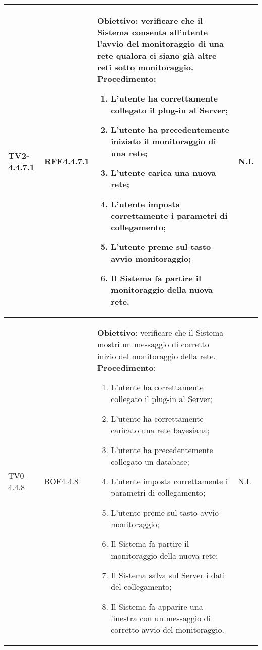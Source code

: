 \begin{longtable}{|C{.15\textwidth}|C{.13\textwidth}|m{.52\textwidth}|C{.08\textwidth}|}
TV2-4.4.7.1 & RFF4.4.7.1 &
	\textbf{Obiettivo}: verificare che il Sistema consenta all'utente l'avvio del monitoraggio di una rete qualora ci siano già altre reti sotto monitoraggio. \newline
	\textbf{Procedimento}:
	\begin{enumerate}
		\item L'utente ha correttamente collegato il plug-in al Server;
		\item L'utente ha precedentemente iniziato il monitoraggio di una rete;
		\item L'utente carica una nuova rete;
		\item L'utente imposta correttamente i parametri di collegamento;
		\item L'utente preme sul tasto avvio monitoraggio;
		\item Il Sistema fa partire il monitoraggio della nuova rete.
	\end{enumerate}
	& N.I. \\
\hline

TV0-4.4.8 & ROF4.4.8 &
	\textbf{Obiettivo}: verificare che il Sistema mostri un messaggio di corretto inizio del monitoraggio della rete. \newline
	\textbf{Procedimento}:
	\begin{enumerate}
		\item L'utente ha correttamente collegato il plug-in al Server;
		\item L'utente ha correttamente caricato una rete bayesiana;
		\item L'utente ha precedentemente collegato un database;
		\item L'utente imposta correttamente i parametri di collegamento;
		\item L'utente preme sul tasto avvio monitoraggio;
		\item Il Sistema fa partire il monitoraggio della nuova rete;
		\item Il Sistema salva sul Server i dati del collegamento;
		\item Il Sistema fa apparire una finestra con un messaggio di corretto avvio del monitoraggio.
	\end{enumerate}
	& N.I. \\
\hline


\end{longtable}
